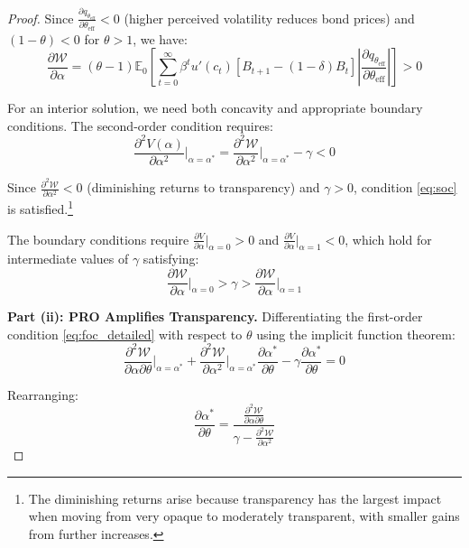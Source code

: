 \documentclass[12pt]{article}
\theoremstyle{plain}
\begin{document}
\begin{proof}
	Since $\frac{\partial q_{\theta_{\text{eff}}}}{\partial \theta_{\text{eff}}} <
		0$ (higher perceived volatility reduces bond prices) and $(1-\theta) < 0$ for
	$\theta > 1$, we have:
	\begin{equation}
		\frac{\partial \mathcal{W}}{\partial \alpha} = (\theta-1) \mathbb{E}_0 \left[ \sum_{t=0}^\infty \beta^t u'(c_t) [B_{t+1} - (1-\delta)B_t] \left|\frac{\partial q_{\theta_{\text{eff}}}}{\partial \theta_{\text{eff}}}\right| \right] > 0 \label{eq:marginal_benefit}
	\end{equation}

	For an interior solution, we need both concavity and appropriate boundary
	conditions. The second-order condition requires:
	\begin{equation}
		\frac{\partial^2 V(\alpha)}{\partial \alpha^2}\bigg|_{\alpha=\alpha^*} = \frac{\partial^2 \mathcal{W}}{\partial \alpha^2}\bigg|_{\alpha=\alpha^*} - \gamma < 0 \label{eq:soc}
	\end{equation}

	Since $\frac{\partial^2 \mathcal{W}}{\partial \alpha^2} < 0$ (diminishing
	returns to transparency) and $\gamma > 0$, condition \eqref{eq:soc} is
	satisfied.\footnote{The diminishing returns arise because transparency has the
		largest impact when moving from very opaque to moderately transparent, with
		smaller gains from further increases.}

	The boundary conditions require $\frac{\partial V}{\partial \alpha}|_{\alpha=0}
		> 0$ and $\frac{\partial V}{\partial \alpha}|_{\alpha=1} < 0$, which hold for
	intermediate values of $\gamma$ satisfying:
	\begin{equation}
		\frac{\partial \mathcal{W}}{\partial \alpha}\bigg|_{\alpha=0} > \gamma > \frac{\partial \mathcal{W}}{\partial \alpha}\bigg|_{\alpha=1} \label{eq:gamma_bounds}
	\end{equation}

	\textbf{Part (ii): PRO Amplifies Transparency.}
	Differentiating the first-order condition \eqref{eq:foc_detailed} with respect to $\theta$ using the implicit function theorem:
	\begin{equation}
		\frac{\partial^2 \mathcal{W}}{\partial \alpha \partial \theta}\bigg|_{\alpha=\alpha^*} + \frac{\partial^2 \mathcal{W}}{\partial \alpha^2}\bigg|_{\alpha=\alpha^*} \frac{\partial \alpha^*}{\partial \theta} - \gamma \frac{\partial \alpha^*}{\partial \theta} = 0 \label{eq:ift_application}
	\end{equation}

	Rearranging:
	\begin{equation}
		\frac{\partial \alpha^*}{\partial \theta} = \frac{\frac{\partial^2 \mathcal{W}}{\partial \alpha \partial \theta}}{\gamma - \frac{\partial^2 \mathcal{W}}{\partial \alpha^2}} \label{eq:transparency_theta_derivative}
	\end{equation}


\end{proof}
\end{document}
